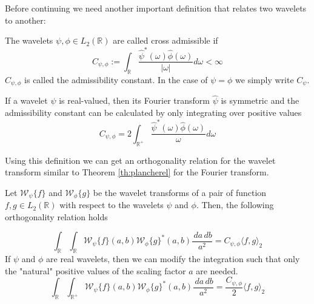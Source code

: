 Before continuing we need another important definition that relates two wavelets to another:
\begin{definition}
    The wavelets $\psi, \phi \in L_2(\mathbb{R})$ are called cross admissible if   
    \begin{equation}
        C_{\psi, \phi} := \int_{\mathbb{R}} \frac{\hat{\psi}^{\ast}(\omega)\hat{\phi}(\omega)}{|\omega|} d \omega < \infty
    \end{equation}
    $C_{\psi, \phi}$ is called the admissibility constant. In the case of $\psi = \phi$ we simply write $C_{\psi}$.

    If a wavelet $\psi$ is real-valued, then its Fourier transform $\hat{\psi}$ is symmetric and the admissibility constant can be calculated by only integrating 
    over positive values 
    \begin{equation}
        C_{\psi, \phi} = 2 \int_{\mathbb{R}^{+}} \frac{\hat{\psi}^{\ast}(\omega)\hat{\phi}(\omega)}{\omega} d \omega
    \end{equation}
\end{definition}

Using this definition we can get an orthogonality relation for the wavelet transform similar to Theorem \ref{th:plancherel} for the Fourier transform.

\begin{theorem}
    Let $\mathscr{W}_{\psi}\{f\}$ and $\mathscr{W}_{\phi}\{g\}$ be the wavelet transforms of a pair of function $f, g \in L_2(\mathbb{R})$ with respect to the wavelets 
    $\psi$ and $\phi$. Then, the following orthogonality relation holds

    \begin{equation}
        \int_{\mathbb{R}} \int_{\mathbb{R}} \mathscr{W}_{\psi}\{f\}(a,b) \mathscr{W}_{\phi}\{g\}^{\ast}(a,b)\frac{\,da \,db}{a^2} = C_{\psi, \phi} \langle f, g \rangle_2
        \label{eq:orth_general}
    \end{equation}
If $\psi$ and $\phi$ are real wavelets, then we can modify the integration such that only the "natural" positive values of the scaling factor $a$ are needed. 
    \begin{equation}
        \int_{\mathbb{R}} \int_{\mathbb{R}^{+}} \mathscr{W}_{\psi}\{f\}(a,b) \mathscr{W}_{\phi}\{g\}^{\ast}(a,b)\frac{\,da \,db}{a^2} = \frac{C_{\psi, \phi}}{2} \langle f, g \rangle_2
        \label{eq:orth_real}
    \end{equation}
    \label{th:cwt_orth_rela}
\end{theorem}


